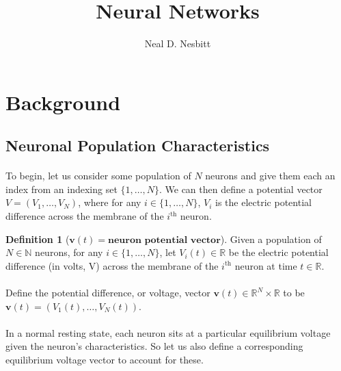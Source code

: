 \documentclass{article}
\title{Neural Networks}
\author{Neal D. Nesbitt}
\begin{document}
\maketitle

\theoremstyle{definition}
\newtheorem{definition}{Definition}[section]
\newtheorem{lemma}{Lemma}[section]


\section{Background}

\subsection{Neuronal Population Characteristics}

\paragraph{}
To begin, let us consider some population of $N$ neurons and give them each an index from an indexing set $\{ 1, \dots, N \}$. We can then define a potential vector $V = ( V_{1}, \dots, V_{N} )$, where for any $i \in \{ 1, \dots, N \}$, $V_{i}$ is the electric potential difference across the membrane of the $i^{\text{th}}$ neuron.

\begin{definition}[$\mathbf{v}(t) = \textbf{neuron potential vector}$]\label{v}
Given a population of $N\in\mathbb{N}$ neurons, for any $i \in \{ 1, \dots, N \}$, let $V_{i}(t)\in\mathbb{R}$ be the electric potential difference (in volts, V) across the membrane of the $i^{\text{th}}$ neuron at time $t\in\mathbb{R}$.\\
\\
Define the potential difference, or voltage, vector $\mathbf{v}(t)\in\mathbb{R}^{N}\times\mathbb{R}$ to be $\mathbf{v}(t) = ( V_{1}(t), \dots, V_{N}(t) )$. 
\end{definition}

\paragraph{}
In a normal resting state, each neuron sits at a particular equilibrium voltage given the neuron's characteristics. So let us also define a corresponding equilibrium voltage vector to account for these.
\end{document}

